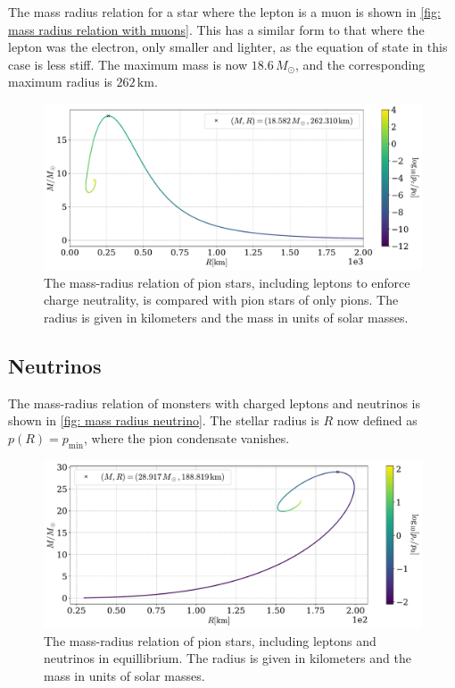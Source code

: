The mass radius relation for a star where the lepton is a muon is shown in \autoref{fig: mass radius relation with muons}.
This has a similar form to that where the lepton was the electron, only smaller and lighter, as the equation of state in this case is less stiff.
The maximum mass is now $18.6\, M_\odot $, and the corresponding maximum radius is $ 262 \,\text{km}$.

\begin{figure}[!htb]
    \centering
    \includegraphics[width=\textwidth]{../scripts/figurer/pion_star/mass_radius__mu.pdf}
    \caption{
        The mass-radius relation of pion stars, including leptons to enforce charge neutrality, is compared with pion stars of only pions.
        The radius is given in kilometers and the mass in units of solar masses.
        }
        \label{fig: mass radius relation with muons}
\end{figure}



\subsection{Neutrinos}


The mass-radius relation of monsters with charged leptons and neutrinos is shown in \autoref{fig: mass radius neutrino}.
The stellar radius is $R$ now defined as $p(R) = p_\text{min}$, where the pion condensate vanishes.


\begin{figure}[!htb]
    \centering
    \includegraphics[width=\textwidth]{../scripts/figurer/pion_star/mass_radius_neutrino.pdf}
    \caption{
        The mass-radius relation of pion stars, including leptons and neutrinos in equillibrium.
        The radius is given in kilometers and the mass in units of solar masses.
        }
        \label{fig: mass radius neutrino}
\end{figure}

